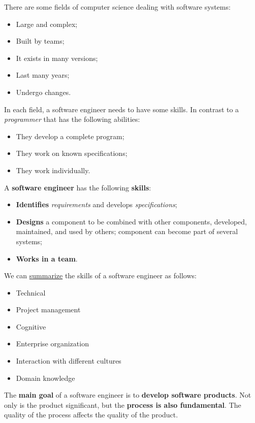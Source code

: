 \documentclass[a4paper]{article}
\begin{document}
    There are some fields of computer science dealing with software systems:
    \begin{itemize}
        \item Large and complex;
        \item Built by teams;
        \item It exists in many versions;
        \item Last many years;
        \item Undergo changes.
    \end{itemize}
    In each field, a software engineer needs to have some skills. In contrast to a \emph{programmer} that has the following abilities:
    \begin{itemize}
        \item They develop a complete program;
        \item They work on known specifications;
        \item They work individually.
    \end{itemize}
    A \textbf{software engineer} has the following \textbf{skills}:
    \begin{itemize}
        \item \textbf{Identifies} \emph{requirements} and develops \emph{specifications};
        \item \textbf{Designs} a component to be combined with other components, developed, maintained, and used by others; component can become part of several systems;
        \item \textbf{Works in a team}.
    \end{itemize}
    We can \underline{summarize} the skills of a software engineer as follows:
    \begin{itemize}
        \item Technical
        \item Project management
        \item Cognitive
        \item Enterprise organization
        \item Interaction with different cultures
        \item Domain knowledge
    \end{itemize}
    The \textbf{main goal} of a software engineer is to \textbf{develop software products}. Not only is the product significant, but the \textbf{process is also fundamental}. The quality of the process affects the quality of the product.

    \newpage
\end{document}
